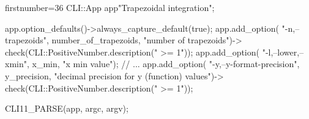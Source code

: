 \begin{cppcode*}{firstnumber=36}
    CLI::App app{"Trapezoidal integration"};

    app.option_defaults()->always_capture_default(true);
    app.add_option(
      "-n,--trapezoids", number_of_trapezoids, 
      "number of trapezoids")->
      check(CLI::PositiveNumber.description(" >= 1"));
    app.add_option(
      "-l,--lower,--xmin", x_min, "x min value");
    // ...
    app.add_option(
      "-y,--y-format-precision", y_precision, 
      "decimal precision for y (function) values")->
      check(CLI::PositiveNumber.description(" >= 1"));

    CLI11_PARSE(app, argc, argv);
\end{cppcode*}



